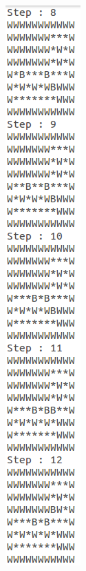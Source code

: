 \documentclass[10pt, letter]{article}
\begin{document}
\begin{figure} [h!]
\begin{subfigure}{.3\textwidth}
  \includegraphics[scale = 0.35]{images/sokoban3-ans3}
\end{subfigure}%
\begin{subfigure}{.3\textwidth}
  \centering

\end{subfigure}
\end{figure}
\end{document}
